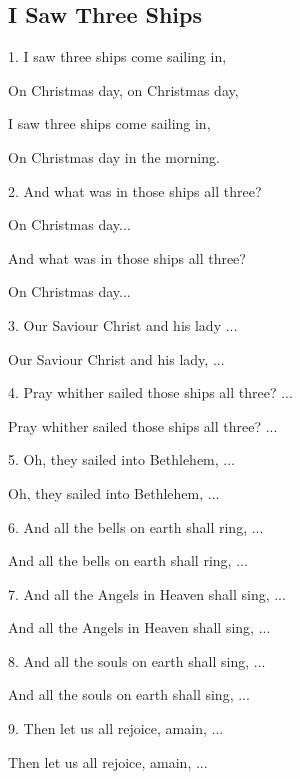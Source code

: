 \subsection{I Saw Three Ships}\label{i_saw_three_ships}
\begin{description}[nosep,leftmargin=\parindent,labelsep=0pt]
\item 1. I saw three ships come sailing in, 
\item On Christmas day, on Christmas day, 
\item I saw three ships come sailing in, 
\item On Christmas day in the morning. 
\vspace{1.5ex}
\item 2. And what was in those ships all three? 
\item On Christmas day... 
\item And what was in those ships all three? 
\item On Christmas day... 
\vspace{1.5ex}
\item 3. Our Saviour Christ and his lady ... 
\item Our Saviour Christ and his lady, ... 
\vspace{1.5ex}
\item 4. Pray whither sailed those ships all three? ... 
\item Pray whither sailed those ships all three? ... 
\vspace{1.5ex}
\item 5. Oh, they sailed into Bethlehem, ... 
\item Oh, they sailed into Bethlehem, ... 
\vspace{1.5ex}
\item 6. And all the bells on earth shall ring, ... 
\item And all the bells on earth shall ring, ... 
\vspace{1.5ex}
\item 7. And all the Angels in Heaven shall sing, ... 
\item And all the Angels in Heaven shall sing, ... 
\vspace{1.5ex}
\item 8. And all the souls on earth shall sing, ... 
\item And all the souls on earth shall sing, ... 
\vspace{1.5ex}
\item 9. Then let us all rejoice, amain, ... 
\item Then let us all rejoice, amain, ... 
\end{description}
